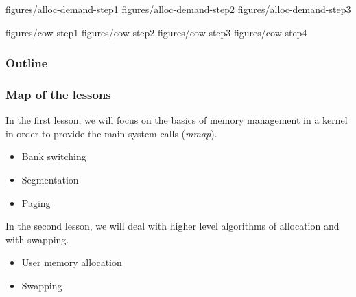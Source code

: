 
		{figures/alloc-demand-step1}
		{figures/alloc-demand-step2}
		{figures/alloc-demand-step3}



		{figures/cow-step1}
		{figures/cow-step2}
		{figures/cow-step3}
		{figures/cow-step4}

%
%



%
%

\begin{frame}
  \titlepage

  \begin{center}
    \logos
  \end{center}
\end{frame}

%
%

\begin{frame}
  \frametitle{Outline}
  \tableofcontents
\end{frame}


\begin{frame}
  \frametitle{Map of the lessons}

  In the first lesson, we will focus on the basics of memory
  management in a kernel in order to provide the main system calls
  (\emph{mmap}).

  \begin{itemize}
  \item
    Bank switching
  \item
    Segmentation
  \item
    Paging
  \end{itemize}

  \-

  In the second lesson, we will deal with higher level algorithms of
  allocation and with swapping.

  \begin{itemize}
  \item
    User memory allocation
  \item
    Swapping
  \end{itemize}

\end{frame}

